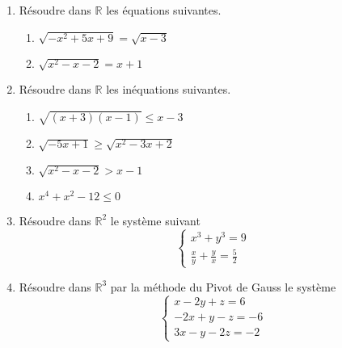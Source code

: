 \documentclass[12pt,a4paper]{article}
\begin{document}
\begin{enumerate}
    \item Résoudre dans $\mathbb{R}$ les équations suivantes.
    \begin{enumerate}
        \item $\sqrt{-x^2 + 5x + 9} = \sqrt{x - 3}$
        \item $\sqrt{x^2 - x - 2} = x + 1$
    \end{enumerate}
    
    \item Résoudre dans $\mathbb{R}$ les inéquations suivantes.
    \begin{enumerate}
        \item $\sqrt{(x + 3)(x - 1)} \leq x - 3$
        \item $\sqrt{-5x + 1} \geq \sqrt{x^2 - 3x + 2}$
        \item $\sqrt{x^{2}-x-2} > x-1 $
        \item $x^4 + x^2 - 12 \leq 0$
    \end{enumerate}
    
    \item Résoudre dans $\mathbb{R}^2$ le système suivant
    \[
    \begin{cases}
        x^3 + y^3 = 9 \\
        \frac{x}{y} + \frac{y}{x} = \frac{5}{2}
    \end{cases}
    \]
    
    \item Résoudre dans $\mathbb{R}^3$ par la méthode du Pivot de Gauss le système
    \[
    \begin{cases}
        x - 2y + z = 6 \\
        -2x + y - z = -6 \\
        3x - y - 2z = -2
    \end{cases}
    \]
\end{enumerate}
\end{document}
